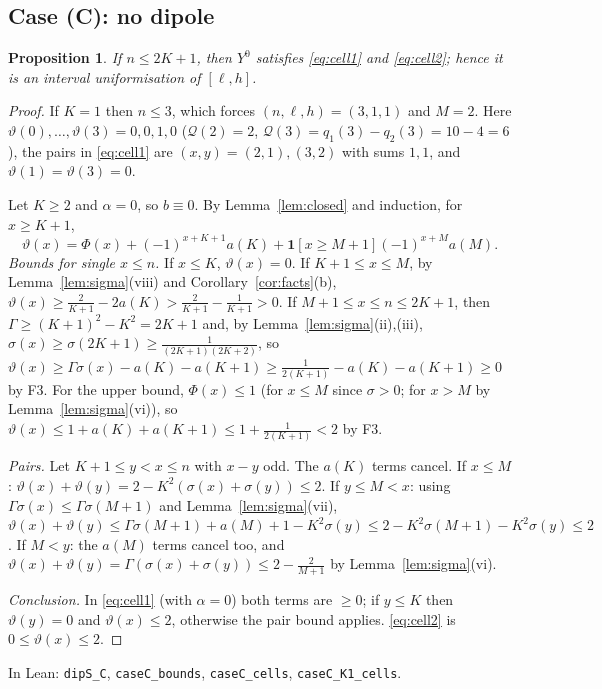 \documentclass[11pt]{amsart}
\newtheorem{proposition}[lemma]{Proposition}
\theoremstyle{definition}
\theoremstyle{remark}
\numberwithin{equation}{section}
\newcommand{\ind}[1]{\mathbf{1}[#1]}
\newcommand{\cQ}{\mathcal{Q}}
\newcommand{\lean}[1]{\texttt{#1}}
\begin{document}
\subsection{Case (C): no dipole}

\begin{proposition}\label{prop:caseC}
If $n\le2K+1$, then $Y^0$ satisfies \eqref{eq:cell1} and \eqref{eq:cell2}; hence it is an interval
uniformisation of $[\ell,h]$.
\end{proposition}

\begin{proof}
If $K=1$ then $n\le3$, which forces $(n,\ell,h)=(3,1,1)$ and $M=2$. Here
$\vartheta(0),\dots,\vartheta(3)=0,0,1,0$ ($\cQ(2)=2$, $\cQ(3)=q_1(3)-q_2(3)=10-4=6$), the pairs in
\eqref{eq:cell1} are $(x,y)=(2,1),(3,2)$ with sums $1,1$, and $\vartheta(1)=\vartheta(3)=0$.

Let $K\ge2$ and $\alpha=0$, so $b\equiv0$. By Lemma~\ref{lem:closed} and induction, for $x\ge K+1$,
\[
  \vartheta(x)=\Phi(x)+(-1)^{x+K+1}a(K)+\ind{x\ge M+1}(-1)^{x+M}a(M).
\]
\emph{Bounds for single $x\le n$.} If $x\le K$, $\vartheta(x)=0$. If $K+1\le x\le M$, by
Lemma~\ref{lem:sigma}(viii) and Corollary~\ref{cor:facts}(b),
$\vartheta(x)\ge\frac2{K+1}-2a(K)>\frac2{K+1}-\frac1{K+1}>0$. If $M+1\le x\le n\le2K+1$, then
$\Gamma\ge(K+1)^2-K^2=2K+1$ and, by Lemma~\ref{lem:sigma}(ii),(iii),
$\sigma(x)\ge\sigma(2K+1)\ge\frac1{(2K+1)(2K+2)}$, so
$\vartheta(x)\ge\Gamma\sigma(x)-a(K)-a(K+1)\ge\frac1{2(K+1)}-a(K)-a(K+1)\ge0$ by F3. For the upper
bound, $\Phi(x)\le1$ (for $x\le M$ since $\sigma>0$; for $x>M$ by Lemma~\ref{lem:sigma}(vi)), so
$\vartheta(x)\le1+a(K)+a(K+1)\le1+\frac1{2(K+1)}<2$ by F3.

\emph{Pairs.} Let $K+1\le y<x\le n$ with $x-y$ odd. The $a(K)$ terms cancel. If $x\le M$:
$\vartheta(x)+\vartheta(y)=2-K^2(\sigma(x)+\sigma(y))\le2$. If $y\le M<x$: using
$\Gamma\sigma(x)\le\Gamma\sigma(M+1)$ and Lemma~\ref{lem:sigma}(vii),
$\vartheta(x)+\vartheta(y)\le\Gamma\sigma(M+1)+a(M)+1-K^2\sigma(y)\le2-K^2\sigma(M+1)-K^2\sigma(y)\le2$.
If $M<y$: the $a(M)$ terms cancel too, and $\vartheta(x)+\vartheta(y)=\Gamma(\sigma(x)+\sigma(y))\le2-\frac2{M+1}$
by Lemma~\ref{lem:sigma}(vi).

\emph{Conclusion.} In \eqref{eq:cell1} (with $\alpha=0$) both terms are $\ge0$; if $y\le K$ then
$\vartheta(y)=0$ and $\vartheta(x)\le2$, otherwise the pair bound applies. \eqref{eq:cell2} is
$0\le\vartheta(x)\le2$.
\end{proof}

In Lean: \lean{dipS\_C}, \lean{caseC\_bounds}, \lean{caseC\_cells}, \lean{caseC\_K1\_cells}.
\end{document}
